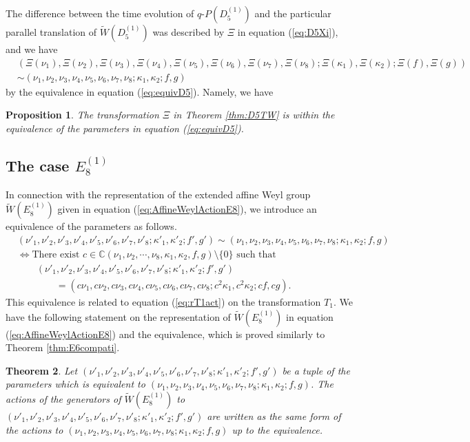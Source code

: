 \documentclass[12pt]{amsart}
\newcommand{\C}{\mathbb {C}}     %
\numberwithin{equation}{section}
\newtheorem{prop}{\bf Proposition}[section]
\newtheorem{thm}[prop]{\bf Theorem}
\theoremstyle{definition}
\begin{document}
The difference between the time evolution of $q$-$P(D^{(1)}_5)$ and the particular parallel translation of $\widetilde{W}(D^{(1)}_{5})$ was described by $\Xi $ in equation (\ref{eq:D5Xi}), and we have
\begin{align}
& ( \Xi (\nu_1) , \Xi (\nu_2 ) , \Xi (\nu_3 ) , \Xi (\nu_4 ) , \Xi (\nu_5 ) , \Xi (\nu_6 ) , \Xi (\nu_7 ) , \Xi (\nu_8 ) ; \Xi (\kappa_1) , \Xi (\kappa_2 ) ; \Xi (f ) , \Xi (g ) )  \\ 
& \sim (\nu_1 , \nu_2 , \nu_3 , \nu_4 ,\nu_5 ,\nu_6 , \nu_7 ,\nu_8 ;\kappa_1 ,\kappa_2 ; f ,g ) \nonumber
\end{align}
by the equivalence in equation  (\ref{eq:equivD5}).
Namely, we have
\begin{prop}
The transformation $\Xi $ in Theorem \ref{thm:D5TW} is within the equivalence of the parameters in equation (\ref{eq:equivD5}).
\end{prop}

\subsection{The case $E^{(1)}_8 $} \label{sec:E18}
In connection with the representation of the extended affine Weyl group $\widetilde{W}(E^{(1)}_{8})$ given in equation (\ref{eq:AffineWeylActionE8}), we introduce an equivalence of the parameters as follows.
\begin{align}
&  (\nu '_1 , \nu '_2 , \nu '_3 , \nu '_4 ,\nu '_5 ,\nu '_6 , \nu '_7 ,\nu '_8 ; \kappa '_1 ,\kappa '_2 ; f' ,g' ) \sim  (\nu_1 , \nu_2 , \nu_3 , \nu_4 ,\nu_5 ,\nu_6 , \nu_7 ,\nu_8 ;\kappa_1 ,\kappa_2 ; f ,g ) \label{eq:equivE8} \\
& \Leftrightarrow \mbox{There exist } c \in \C (\nu_1 , \nu_2 , \cdots ,\nu_8 ,\kappa_1 ,\kappa_2 , f ,g ) \setminus \{ 0 \} \mbox{ such that }  \nonumber \\
& \qquad (\nu '_1 , \nu '_2 , \nu '_3 , \nu '_4 ,\nu '_5 ,\nu '_6 , \nu '_7 ,\nu '_8 ; \kappa '_1 ,\kappa '_2 ; f' ,g' )  \nonumber \\
& \qquad \qquad =  (c \nu _1, c \nu _ 2, c\nu_3 , c \nu_4 , c \nu_5, c \nu_6 , c \nu_7, c \nu_8 ; c^2 \kappa_1 , c^2 \kappa_2 ; cf , c g )  .  \nonumber
\end{align}
This equivalence is related to equation (\ref{eq:rT1act}) on the transformation $T_1$.
We have the following statement on the representation of $\widetilde{W}(E^{(1)}_{8})$ in equation (\ref{eq:AffineWeylActionE8}) and the equivalence, which is proved similarly to Theorem \ref{thm:E6compati}.
\begin{thm}
Let $(\nu '_1 , \nu '_2 , \nu '_3 , \nu '_4 ,\nu '_5 ,\nu '_6 , \nu '_7 ,\nu '_8 ; \kappa '_1 ,\kappa '_2 ; f' ,g' ) $ be a tuple of the parameters which is equivalent to $ (\nu_1 , \nu_2 , \nu_3 , \nu_4 ,\nu_5 ,\nu_6 , \nu_7 ,\nu_8 ;\kappa_1 ,\kappa_2 ; f ,g )$.
The actions of the generators of  $\widetilde{W}(E^{(1)}_8)$ to $(\nu '_1 , \nu '_2 , \nu '_3 , \nu '_4 ,\nu '_5 ,\nu '_6 , \nu '_7 ,\nu '_8 ; \kappa '_1 ,\kappa '_2 ; f' ,g' ) $ are written as the same form of the actions to $(\nu _1 , \nu _2 , \nu _3 , \nu _4 ,\nu _5 ,\nu _6 , \nu _7 ,\nu _8 ; \kappa _1 ,\kappa _2 ; f ,g ) $ up to the equivalence.
\end{thm}
\end{document}
